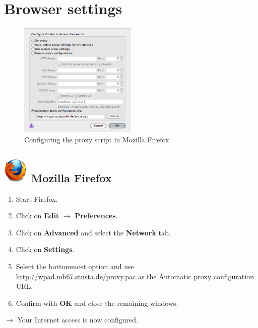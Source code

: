 \documentclass[a4paper,12pt]{scrartcl}
\newcommand{\optemph}[1]{\textbf{#1}}
\begin{document}
\newpage

\section*{Browser settings}

\begin{figure}
  \vspace{-30pt}
  \begin{center}
    \includegraphics[width=0.5\textwidth,keepaspectratio]{Bilder/Proxy_Firefox_EN}
  \end{center}
  \caption{Configuring the proxy script in Mozilla Firefox}
\end{figure}

\subsection*{\includegraphics[height=1.2cm,keepaspectratio]{Bilder/Firefox_35_logo} Mozilla Firefox}
\begin{enumerate}
    \item Start Firefox.
	\item Click on \optemph{Edit} $\rightarrow$ \optemph{Preferences}.
	\item Click on \optemph{Advanced} and select the \optemph{Network} tab.
	\item Click on \optemph{Settings}.
    \item Select the bottommost option and use \\ \url{http://wpad.mb67.stusta.de/proxy.pac} as the Automatic proxy configuration URL.
	\item Confirm with \optemph{OK} and close the remaining windows.
\end{enumerate}
$\rightarrow$ Your Internet access is now configured.
\end{document}
